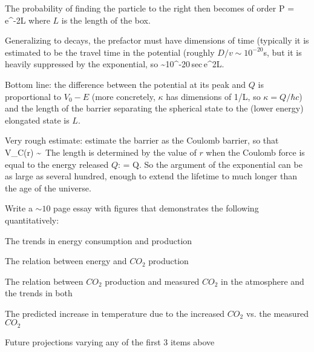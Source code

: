 \documentclass[11pt]{book}
\begin{document}
\item The probability of finding the particle to the right then becomes of order
\be
P = e^{-2\kappa L}\ee
where $L$ is the length of the box.
\eei
\item Generalizing to decays, the prefactor must have dimensions of time (typically it is estimated to be the travel time in the potential (roughly $D/v\sim 10^{-20}$s, but it is heavily suppressed by the exponential, so
\be
\tau \sim 10^{-20}\,{\rm sec}\,e^{2\kappa L}.\ee
\item Bottom line: the difference between the potential at its peak and $Q$ is proportional to $V_0-E$ (more concretely, $\kappa$ has dimensions of 1/L, so $\kappa = Q/\hbar c$) and the length of the barrier separating the spherical state to the (lower energy) elongated state is $L$. 

Very rough estimate: estimate the barrier as the Coulomb barrier, so that 
\be
V_C(r) \sim\,
\ee
The length is determined by the value of $r$ when the Coulomb force is equal to the energy released $Q$:
\be
  = Q.\ee
 So the argument of the exponential can be as large as several hundred,
 enough to extend the lifetime to much longer than the age of the universe.
\eee



Write a $\sim10$ page essay with figures that demonstrates the following quantitatively:
\bee
\item The trends in energy consumption and production 
\item The relation between energy and $CO_2$ production
\item The relation between $CO_2$ production and measured $CO_2$ in the atmosphere and the trends in both
\item The predicted increase in temperature due to the increased $CO_2$ vs. the measured $CO_2$
\item Future projections varying any of the first 3 items above
\eee

\end{document}
